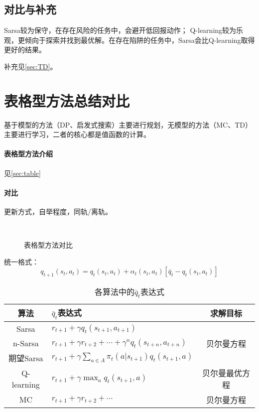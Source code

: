 \documentclass[
12pt, %
a4paper, 
oneside, %
headinclude,footinclude, %
]{scrartcl}
\begin{document}
\subsection[对比与补充]{对比与补充}\label{sec:TD back}
Sarsa较为保守，在存在风险的任务中，会避开低回报动作； Q-learning较为乐观，更倾向于探索并找到最优解。在存在陷阱的任务中，Sarsa会比Q-learning取得更好的结果。

补充见\ref{sec:TD}。
\section{表格型方法总结对比}
基于模型的方法（DP、启发式搜索）主要进行规划，无模型的方法（MC、TD）主要进行学习，二者的核心都是值函数的计算。
\paragraph{表格型方法介绍}\label{sec:table back}
见\ref{sec:table}
\paragraph{对比}
更新方式，自举程度，同轨/离轨。

\begin{figure}[H]
\centering
{} \quad
{} \\
 \quad
{} \quad
{}
\caption{表格型方法对比}
\end{figure}

统一格式：
$$ q_{t + 1}(s_t, a_t) = q_t(s_t, a_t) + \alpha_t(s_t, a_t)[\bar{q}_t - q_t(s_t, a_t)] $$

\begin{table}[H]
\centering
\begin{tabular}{|c|l|c|}
\hline
算法 & $ \bar{q}_t $表达式 & 求解目标 \\
\hline
Sarsa & $ r_{t + 1} + \gamma q_t(s_{t + 1}, a_{t + 1}) $ & \multirow{3}{*}{贝尔曼方程} \\
\cline{1-2}
n-Sarsa & $ r_{t + 1} + \gamma r_{t + 2} + \cdots + \gamma^n q_t(s_{t + n}, a_{t + n}) $ &  \\
\cline{1-2}
期望Sarsa & $ r_{t + 1} + \gamma \sum_{a \in A} \pi_t(a|s_{t + 1}) q_t(s_{t + 1}, a) $ &  \\
\hline
Q-learning & $ r_{t + 1} + \gamma \max_a q_t(s_{t + 1}, a) $ & 贝尔曼最优方程 \\
\hline
MC & $ r_{t + 1} + \gamma r_{t + 2} + \cdots $ & 贝尔曼方程 \\
\hline
\end{tabular}
\caption{各算法中的$ \bar{q}_t $表达式}
\end{table}
\end{document}
